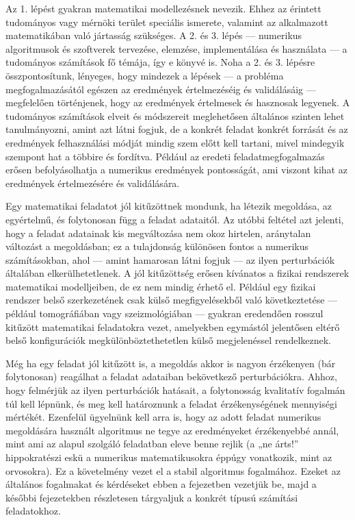 \documentclass[
  magyar,
  11pt]{article}
\begin{document}
Az 1. lépést gyakran matematikai modellezésnek nevezik. Ehhez az
érintett tudományos vagy mérnöki terület speciális ismerete, valamint az
alkalmazott matematikában való jártasság szükséges. A 2. és 3. lépés ---
numerikus algoritmusok és szoftverek tervezése, elemzése, implementálása
és használata --- a tudományos számítások fő témája, így e könyvé is.
Noha a 2. és 3. lépésre összpontosítunk, lényeges, hogy mindezek a
lépések --- a probléma megfogalmazásától egészen az eredmények
értelmezéséig és validálásáig --- megfelelően történjenek, hogy az
eredmények értelmesek és hasznosak legyenek. A tudományos számítások
elveit és módszereit meglehetősen általános szinten lehet tanulmányozni,
amint azt látni fogjuk, de a konkrét feladat konkrét forrását és az
eredmények felhasználási módját mindig szem előtt kell tartani, mivel
mindegyik szempont hat a többire és fordítva. Például az eredeti
feladatmegfogalmazás erősen befolyásolhatja a numerikus eredmények
pontosságát, ami viszont kihat az eredmények értelmezésére és
validálására.

Egy matematikai feladatot jól kitűzöttnek mondunk, ha létezik megoldása,
az egyértelmű, és folytonosan függ a feladat adataitól. Az utóbbi
feltétel azt jelenti, hogy a feladat adatainak kis megváltozása nem okoz
hirtelen, aránytalan változást a megoldásban; ez a tulajdonság különösen
fontos a numerikus számításokban, ahol --- amint hamarosan látni fogjuk
--- az ilyen perturbációk általában elkerülhetetlenek. A jól kitűzöttség
erősen kívánatos a fizikai rendszerek matematikai modelljeiben, de ez
nem mindig érhető el. Például egy fizikai rendszer belső szerkezetének
csak külső megfigyelésekből való következtetése --- például
tomográfiában vagy szeizmológiában --- gyakran eredendően rosszul
kitűzött matematikai feladatokra vezet, amelyekben egymástól jelentősen
eltérő belső konfigurációk megkülönböztethetetlen külső megjelenéssel
rendelkeznek.

Még ha egy feladat jól kitűzött is, a megoldás akkor is nagyon
érzékenyen (bár folytonosan) reagálhat a feladat adataiban bekövetkező
perturbációkra. Ahhoz, hogy felmérjük az ilyen perturbációk hatásait, a
folytonosság kvalitatív fogalmán túl kell lépnünk, és meg kell
határoznunk a feladat érzékenységének mennyiségi mértékét. Ezenfelül
ügyelnünk kell arra is, hogy az adott feladat numerikus megoldására
használt algoritmus ne tegye az eredményeket érzékenyebbé annál, mint
ami az alapul szolgáló feladatban eleve benne rejlik (a „ne árts!''
hippokratészi eskü a numerikus matematikusokra éppúgy vonatkozik, mint
az orvosokra). Ez a követelmény vezet el a stabil algoritmus fogalmához.
Ezeket az általános fogalmakat és kérdéseket ebben a fejezetben vezetjük
be, majd a későbbi fejezetekben részletesen tárgyaljuk a konkrét típusú
számítási feladatokhoz.
\end{document}
